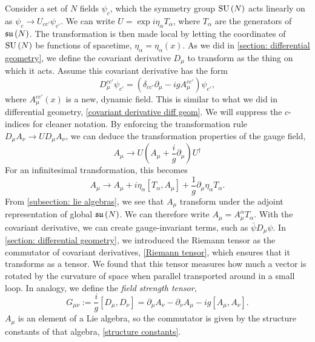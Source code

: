 Consider a set of $N$ fields $\psi_c$, which the symmetry group $\text{SU}\left(N\right)$ acts linearly on as $\psi_c \rightarrow U_{cc'} \psi_{c'}$.
We can write $U = \exp{i \eta_\alpha T_\alpha}$, where $T_\alpha$ are the generators of $\mathfrak{su}\left(N\right)$.
The transformation is then made local by letting the coordinates of $\text{SU}\left(N\right)$ be functions of spacetime, $\eta_\alpha = \eta_\alpha(x)$.
As we did in \autoref{section: differential geometry}, we define the covariant derivative $D_\mu$ to transform as the thing on which it acts.
Assume this covariant derivative has the form
%
\begin{equation}
    \label{covariant derivative Yang-Mills}
    D_\mu^{cc'} \psi_{c'} = (\delta_{cc'}\partial_\mu - i g A_\mu^{cc'} )\psi_{c'},
\end{equation}
%
where $A_\mu^{cc'}(x)$ is a new, dynamic field.
This is similar to what we did in differential geometry, \autoref{covariant derivative diff geom}.
We will suppress the $c$-indices for cleaner notation.
By enforcing the transformation rule $D_\mu A_\nu \rightarrow U D_\mu A_\nu$, we can deduce the transformation properties of the gauge field, 
%
\begin{equation}
    \label{Gauge transformation gauge field}
    A_\mu\rightarrow U \left(A_\mu + \frac{i}{g} \partial_\mu\right) U^\dagger
\end{equation}
%
For an infinitesimal transformation, this becomes
%
\begin{equation}
    A_\mu \rightarrow A_\mu + i \eta_\alpha [T_\alpha, A_\mu] + \frac{1}{g} \partial_\mu \eta_\alpha T_\alpha.
\end{equation}
%
From \autoref{subsection: lie algebras}, we see that $A_\mu$ transform under the adjoint representation of global $\mathfrak{su}\left(N\right)$.
We can therefore write $A_\mu = A_\mu^\alpha T_\alpha$.
With the covariant derivative, we can create gauge-invariant terms, such as $\bar \psi D_\mu \psi$.
In \autoref{section: differential geometry}, we introduced the Riemann tensor as the commutator of covariant derivatives, \autoref{Riemann tensor}, which ensures that it transforms as a tensor.
We found that this tensor measures how much a vector is rotated by the curvature of space when parallel transported around in a small loop.
In analogy, we define the \emph{field strength tensor},
%
\begin{equation}
    G_{\mu \nu} := \frac{i}{g} [D_\mu, D_\nu]
    = \partial_\mu A_\nu - \partial_\nu A_\mu - i g[A_\mu, A_\nu].
\end{equation}
%
$A_\mu$ is an element of a Lie algebra, so the commutator is given by the structure constants of that algebra, \autoref{structure constants}.

